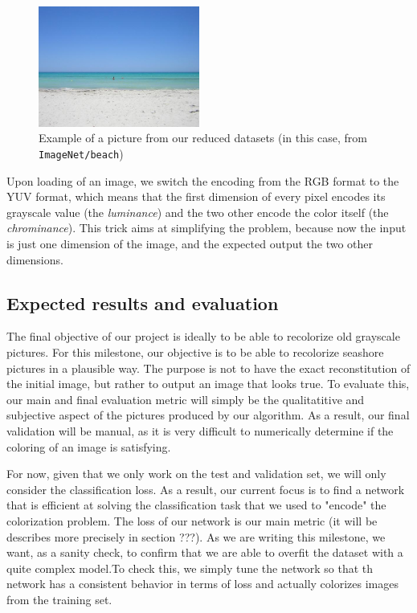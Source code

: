 \documentclass[10pt,twocolumn,letterpaper]{article}
\begin{document}
\begin{figure}
\begin{center}
\includegraphics[width=200px]{img/beach.jpg}
\caption{Example of a picture from our reduced datasets (in this case, from \texttt{ImageNet/beach})}
\label{inex}
\end{center}
\end{figure}

Upon loading of an image, we switch the encoding from the RGB format to the YUV format, which means that the first dimension of every pixel encodes its grayscale value (the \textit{luminance}) and the two other encode the color itself (the \textit{chrominance}). This trick aims at simplifying the problem, because now the input is just one dimension of the image, and the expected output the two other dimensions.

\subsection{Expected results and evaluation}


The final objective of our project is ideally to be able to recolorize old grayscale pictures. For this milestone, our objective is to be able to recolorize seashore pictures in a plausible way. The purpose is not to have the exact reconstitution of the initial image, but rather to output an image that looks true. To evaluate this, our main and final evaluation metric will simply be the qualitatitive and subjective aspect of the pictures produced by our algorithm. As a result, our final validation will be manual, as it is very difficult to numerically determine if the coloring of an image is satisfying.

For now, given that we only work on the test and validation set, we will only consider the classification loss. As a result, our current focus is to find a network that is efficient at solving the classification task that we used to "encode" the colorization problem. The loss of our network is our main metric (it will be describes more precisely in section ???). As we are writing this milestone, we want, as a sanity check, to confirm that we are able to overfit the dataset with a quite complex model.To check this, we simply tune the network so that th network has a consistent behavior in terms of loss and actually colorizes images from the training set.
\end{document}
